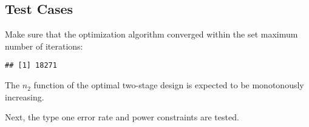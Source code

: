 \documentclass[
]{book}
\newenvironment{Shaded}{\begin{snugshade}}{\end{snugshade}}
\newcommand{\DecValTok}[1]{\textcolor[rgb]{0.00,0.00,0.81}{#1}}
\newcommand{\KeywordTok}[1]{\textcolor[rgb]{0.13,0.29,0.53}{\textbf{#1}}}
\newcommand{\NormalTok}[1]{#1}
\newcommand{\OperatorTok}[1]{\textcolor[rgb]{0.81,0.36,0.00}{\textbf{#1}}}
\newcommand{\StringTok}[1]{\textcolor[rgb]{0.31,0.60,0.02}{#1}}
\begin{document}
\hypertarget{test-cases-1}{%
\subsection{Test Cases}\label{test-cases-1}}

Make sure that the optimization algorithm converged within the set
maximum number of iterations:

\begin{Shaded}
\end{Shaded}

\begin{verbatim}
## [1] 18271
\end{verbatim}

The \(n_2\) function of the optimal two-stage design is expected to be
monotonously increasing.

\begin{Shaded}
\end{Shaded}

Next, the type one error rate and power constraints are tested.
\end{document}
